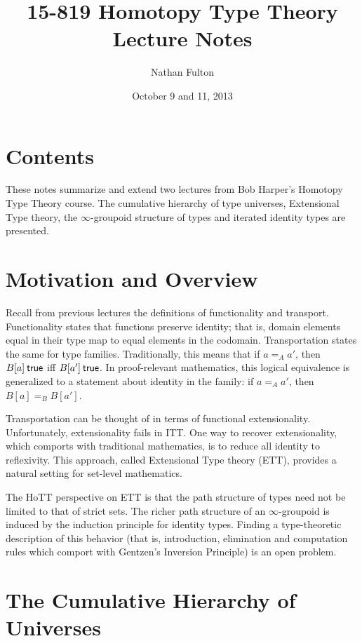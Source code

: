 \documentclass[12pt]{article}
\begin{document}
\title{15-819 Homotopy Type Theory Lecture Notes} 
\author{Nathan Fulton}
\date{October 9 and 11, 2013}

\maketitle

\section{Contents}\label{sec:contents}

These notes summarize and extend two lectures from Bob Harper's Homotopy Type Theory course.  
The cumulative hierarchy of type universes, Extensional Type theory, the $\infty$-groupoid
structure of types and iterated identity types are presented.

\section{Motivation and Overview}\label{sec:oview}

Recall from previous lectures the definitions of functionality and transport.
Functionality states that functions preserve identity; that is, domain elements
equal in their type map to equal elements in the codomain.
Transportation states the same for type families.  Traditionally, this means
that if $a =_A a'$, then $B[a] \true$ iff $B[a'] \true$.  In proof-relevant
mathematics, this logical equivalence is generalized to a statement about
identity in the family: if $a =_A a'$, then $B[a] =_B B[a']$.

Transportation can be thought of in terms of functional extensionality.
Unfortunately, extensionality fails in ITT.  One way to recover 
extensionality, which comports with traditional mathematics, is to reduce all 
identity to reflexivity.  This approach, called Extensional Type theory (ETT), 
provides a natural setting for set-level mathematics.

The HoTT perspective on ETT is that the path structure of types need not 
be limited to that of strict sets.
The richer path structure of an $\infty$-groupoid is induced by the induction
principle for identity types.
Finding a type-theoretic description of this behavior (that is, introduction,
elimination and computation rules which comport with Gentzen's Inversion
Principle) is an open problem.


\section{The Cumulative Hierarchy of Universes}\label{sec:universe}
\end{document}

